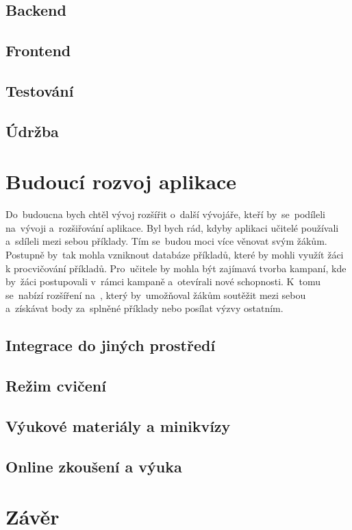 \documentclass[14pt,a4paper]{article}
\begin{document}
        \subsection{Backend}
        \subsection{Frontend}
        \subsection{Testování}
        \subsection{Údržba}
        
	\section{Budoucí rozvoj aplikace}
        Do~budoucna bych chtěl vývoj rozšířit o~další vývojáře, kteří by~se~podíleli na~vývoji a~rozšiřování aplikace.
        Byl bych rád, kdyby aplikaci učitelé používali a~sdíleli mezi sebou příklady. Tím se~budou moci více věnovat svým žákům.
        Postupně by~tak mohla vzniknout databáze příkladů, které by mohli využít žáci k procvičování příkladů. Pro~učitele by mohla být zajímavá tvorba kampaní, kde by~žáci postupovali v~rámci kampaně a~otevírali nové schopnosti.
        K~tomu se~nabízí rozšíření na~, který by~umožňoval žákům soutěžit mezi sebou a~získávat body za~splněné příklady nebo posílat výzvy ostatním.

        \subsection{Integrace do jiných prostředí}
        \subsection{Režim cvičení}
        \subsection{Výukové materiály a minikvízy}
        \subsection{Online zkoušení a výuka}
	
	\section{Závěr}

\newpage
\printbibliography
\end{document}
